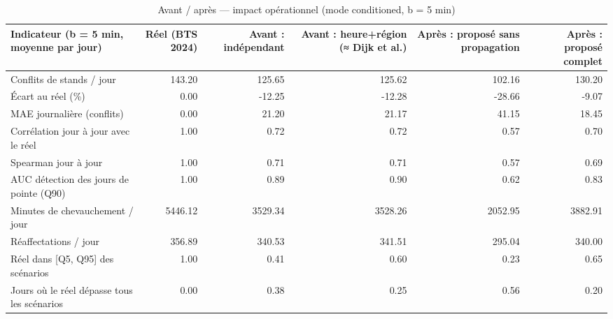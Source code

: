 \begin{table}
\caption{Avant / après — impact opérationnel (mode conditioned, b = 5 min)}
\label{tab:T3b_conditioned}
\begin{tabular}{lrrrrr}
\toprule
Indicateur (b = 5 min, moyenne par jour) & Réel (BTS 2024) & Avant : indépendant & Avant : heure+région (≈ Dijk et al.) & Après : proposé sans propagation & Après : proposé complet \\
\midrule
Conflits de stands / jour & 143.20 & 125.65 & 125.62 & 102.16 & 130.20 \\
Écart au réel (\%) & 0.00 & -12.25 & -12.28 & -28.66 & -9.07 \\
MAE journalière (conflits) & 0.00 & 21.20 & 21.17 & 41.15 & 18.45 \\
Corrélation jour à jour avec le réel & 1.00 & 0.72 & 0.72 & 0.57 & 0.70 \\
Spearman jour à jour & 1.00 & 0.71 & 0.71 & 0.57 & 0.69 \\
AUC détection des jours de pointe (Q90) & 1.00 & 0.89 & 0.90 & 0.62 & 0.83 \\
Minutes de chevauchement / jour & 5446.12 & 3529.34 & 3528.26 & 2052.95 & 3882.91 \\
Réaffectations / jour & 356.89 & 340.53 & 341.51 & 295.04 & 340.00 \\
Réel dans [Q5, Q95] des scénarios & 1.00 & 0.41 & 0.60 & 0.23 & 0.65 \\
Jours où le réel dépasse tous les scénarios & 0.00 & 0.38 & 0.25 & 0.56 & 0.20 \\
\bottomrule
\end{tabular}
\end{table}
